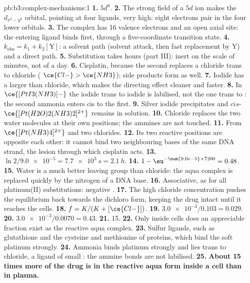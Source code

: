 \begin{solution}{pb:b3:complex-mechanisms:1}
\textbf{1.} $5d^8$.
\textbf{2.} The strong field of a $5d$ ion makes the $d_{x^2-y^2}$ orbital, pointing at four
ligands, very high: eight electrons pair in the four lower orbitals.
\textbf{3.} The complex has 16 valence electrons and an open axial site: the entering
ligand binds first, through a five-coordinate transition state.
\textbf{4.} $k_{\mathrm{obs}} = k_1 + k_2[\mathrm Y]$: a solvent path (solvent attack, then fast replacement by Y)
and a direct path.
\textbf{5.} Substitution takes hours (part III): inert on the scale of minutes, not of
a day.
\textbf{6.} Cisplatin, because the second  replaces a chloride trans to chloride
( $\ce{Cl-} > \ce{NH3}$); side products form as well.
\textbf{7.} Iodide has a larger  than chloride, which makes the directing
effect cleaner and faster.
\textbf{8.} In $\ce{[PtI3(NH3)]-}$ the iodide trans to iodide is labilised, not the one trans to
: the second ammonia enters cis to the first.
\textbf{9.} Silver iodide precipitates and $cis$-$\ce{[Pt(H2O)2(NH3)2]^{2+}}$ remains in solution.
\textbf{10.} Chloride replaces the two water molecules at their own positions; the
ammines are not touched.
\textbf{11.} From $\ce{[Pt(NH3)4]^{2+}}$ and two chlorides.
\textbf{12.} Its two reactive positions are opposite each other: it cannot bind two
neighbouring bases of the same DNA strand, the lesion through which cisplatin
acts.
\textbf{13.} $\ln2/\num{9.0e-5} = \qty{7.7e3}{s} = \qty{2.1}{h}$.
\textbf{14.} $1 - \eu^{-\num{9.0e-5} \times 7200} = 0.48$.
\textbf{15.} Water is a much better leaving group than chloride: the aqua complex is
replaced quickly by the nitrogen of a DNA base.
\textbf{16.} Associative, as for all platinum(II) substitutions: negative .
\textbf{17.} The high chloride concentration pushes the equilibrium back towards the
dichloro form, keeping the drug intact until it reaches the cells.
\textbf{18.} $f = K/(K + [\ce{Cl-}])$.
\textbf{19.} $\num{3.0e-3}/0.103 = 0.029$.
\textbf{20.} $\num{3.0e-3}/0.0070 = 0.43$.
\textbf{21.} 15.
\textbf{22.} Only inside cells does an appreciable fraction exist as the reactive aqua
complex.
\textbf{23.} Sulfur ligands, such as glutathione and the cysteine and methionine of
proteins, which bind the soft platinum strongly.
\textbf{24.} Ammonia binds platinum strongly and lies trans to chloride, a ligand of
small : the ammine bonds are not labilised.
\textbf{25.} \textbf{About 15 times more of the drug is in the reactive aqua form inside a
cell than in plasma.}
\end{solution}
